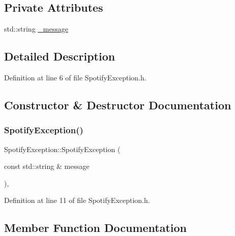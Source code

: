 \subsection*{Private Attributes}
\begin{DoxyCompactItemize}
\item 
std\+::string \mbox{\hyperlink{struct_spotify_exception_ab01d942d5a833f0be7dfc31454396895}{\+\_\+message}}
\end{DoxyCompactItemize}


\subsection{Detailed Description}


Definition at line 6 of file Spotify\+Exception.\+h.



\subsection{Constructor \& Destructor Documentation}
\mbox{\label{struct_spotify_exception_a803594eb661bfdbfb34afe22a9888f94}} 
\subsubsection{\texorpdfstring{Spotify\+Exception()}{SpotifyException()}}
{\footnotesize\ttfamily Spotify\+Exception\+::\+Spotify\+Exception (\begin{DoxyParamCaption}\item[{const std\+::string \&}]{message }\end{DoxyParamCaption})\hspace{0.3cm}{\ttfamily [inline]}, {\ttfamily [explicit]}}



Definition at line 11 of file Spotify\+Exception.\+h.



\subsection{Member Function Documentation}
\mbox{\label{struct_spotify_exception_a1d13e0a9bd10d02f62d8c29fa9144ffd}} 

